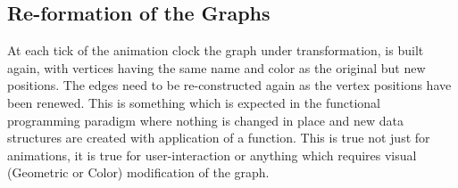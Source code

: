 \subsection{Re-formation of the Graphs}
At each tick of the animation clock the graph under transformation, is built
again, with vertices having the same name and color as the original but new
positions. The edges need to be re-constructed again as the vertex positions
have been renewed. This is something which is expected in the functional
programming paradigm where nothing is changed in place and new data structures
are created with application of a function. This is true not just for
animations, it is true for user-interaction or anything which requires visual
(Geometric or Color) modification of the graph.

